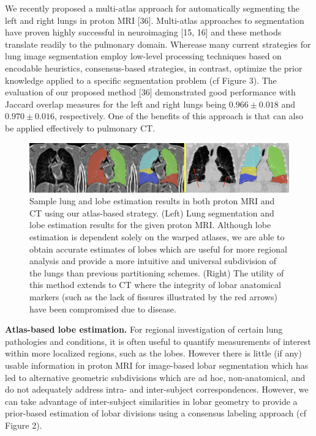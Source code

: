 \documentclass[11pt,]{article}
\begin{document}
We recently proposed a multi-atlas approach for automatically segmenting
the left and right lungs in proton MRI {[}36{]}. Multi-atlas approaches
to segmentation have proven highly successful in neuroimaging {[}15,
16{]} and these methods translate readily to the pulmonary domain.
Wherease many current strategies for lung image segmentation employ
low-level processing techniques based on encodable heuristics,
consensus-based strategies, in contrast, optimize the prior knowledge
applied to a specific segmentation problem (cf Figure 3). The evaluation
of our proposed method {[}36{]} demonstrated good performance with
Jaccard overlap measures for the left and right lungs being
$0.966 \pm 0.018$ and $0.970 \pm 0.016$, respectively. One of the
benefits of this approach is that can also be applied effectively to
pulmonary CT.

\begin{figure}[htbp]
\centering
\includegraphics{Figs/lungEstimation.png}
\caption{Sample lung and lobe estimation results in both proton MRI and
CT using our atlas-based strategy. (Left) Lung segmentation and lobe
estimation results for the given proton MRI. Although lobe estimation is
dependent solely on the warped atlases, we are able to obtain accurate
estimates of lobes which are useful for more regional analysis and
provide a more intuitive and universal subdivision of the lungs than
previous partitioning schemes. (Right) The utility of this method
extends to CT where the integrity of lobar anatomical markers (such as
the lack of fissures illustrated by the red arrows) have been
compromised due to disease.}
\end{figure}

\textbf{Atlas-based lobe estimation.} For regional investigation of
certain lung pathologies and conditions, it is often useful to quantify
measurements of interest within more localized regions, such as the
lobes. However there is little (if any) usable information in proton MRI
for image-based lobar segmentation which has led to alternative
geometric subdivisions which are ad hoc, non-anatomical, and do not
adequately address intra- and inter-subject correspondences. However, we
can take advantage of inter-subject similarities in lobar geometry to
provide a prior-based estimation of lobar divisions using a consensus
labeling approach (cf Figure 2).
\end{document}
